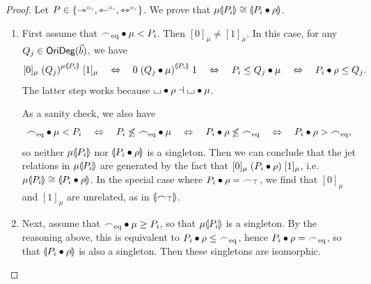 \documentclass[a4paper]{memoir}
\begin{document}
\begin{proof}
	Let $P \in \accol{\jetsym\pmr{a_i}, \tejsym\pmr{a_i}, \equijetsym\pmr{a_i}}$.
	We prove that $\mu {\llparenthesis P_i \rrparenthesis} \cong {\llparenthesis P_i \mathbin{\bullet}\rho \rrparenthesis}$.
	
	\begin{enumerate}
		\item First assume that ${\frown}_{\mathrm{eq}} \mathbin{\bullet} \mu < P_i$.
		Then $[0]_\mu \neq [1]_\mu$.
		In this case, for any $Q_j \in \mathsf{OriDeg}(\vec b)$, we have
		\[
			[0]_\mu \mathrel{(Q_j)}^{\mu {\llparenthesis P_i \rrparenthesis}} [1]_\mu 
			\quad\Leftrightarrow\quad
			0 \mathrel{(Q_j \mathbin{\bullet} \mu)}^{{\llparenthesis P_i \rrparenthesis}} 1
			\quad\Leftrightarrow\quad
			P_i \leq Q_j \mathbin{\bullet} \mu
			\quad\Leftrightarrow\quad
			P_i \mathbin{\bullet} \rho \leq Q_j.
		\]
		The latter step works because ${\llcorner\hspace{-.4ex}\lrcorner} \mathbin{\bullet} \rho \dashv {\llcorner\hspace{-.4ex}\lrcorner} \mathbin{\bullet} \mu$.
		
		As a sanity check, we also have
		\[
			{\frown}_{\mathrm{eq}} \mathbin{\bullet} \mu < P_i
			\quad\Leftrightarrow\quad
			P_i \not\leq {\frown}_{\mathrm{eq}} \mathbin{\bullet} \mu
			\quad\Leftrightarrow\quad
			P_i \mathbin{\bullet} \rho \not\leq {\frown}_{\mathrm{eq}}
			\quad\Leftrightarrow\quad
			P_i \mathbin{\bullet} \rho > {\frown}_{\mathrm{eq}},
		\]
		so neither $\mu {\llparenthesis P_i \rrparenthesis}$ nor ${\llparenthesis P_i \mathbin{\bullet} \rho \rrparenthesis}$ is a singleton.
		Then we can conclude that the jet relations in $\mu {\llparenthesis P_i \rrparenthesis}$ are generated by the fact that $[0]_\mu \mathrel{(P_i \mathbin{\bullet} \rho)} [1]_\mu$, i.e. $\mu {\llparenthesis P_i \rrparenthesis} \cong {\llparenthesis P_i \mathbin{\bullet}\rho \rrparenthesis}$.
		In the special case where $P_i \mathbin{\bullet} \rho = {\frown}_\top$, we find that $[0]_\mu$ and $[1]_\mu$ are unrelated, as in ${\llparenthesis {\frown}_\top \rrparenthesis}$.
		
		\item Next, assume that ${\frown}_{\mathrm{eq}} \mathbin{\bullet} \mu \geq P_i$, so that $\mu {\llparenthesis P_i \rrparenthesis}$ is a singleton.
		By the reasoning above, this is equivalent to $P_i \mathbin{\bullet} \rho \leq {\frown}_{\mathrm{eq}}$, hence $P_i \mathbin{\bullet} \rho = {\frown}_{\mathrm{eq}}$, so that $ {\llparenthesis P_i \mathbin{\bullet} \rho \rrparenthesis}$ is also a singleton.
		Then these singletons are isomorphic. \qedhere
	\end{enumerate}
\end{proof}
\end{document}
